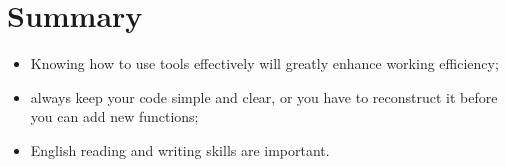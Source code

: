 \documentclass[12pt,a4paper,UTF8]{article}
\begin{document}
\section{Summary}
\begin{itemize}
	\item Knowing how to use tools effectively will greatly enhance working efficiency;
	\item always keep your code simple and clear, or you have to reconstruct it before you can add new functions;
	\item English reading and writing skills are important.
\end{itemize}
\end{document}
